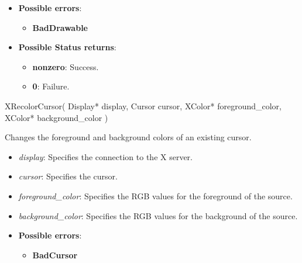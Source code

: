 \documentclass{report}
\begin{document}
\begin{itemize}
            \begin{itemize}
                \item \textbf{Possible errors}:
                    \begin{itemize}
                        \item \textbf{BadDrawable}
                    \end{itemize}
                \item \textbf{Possible Status returns}:
                    \begin{itemize}
                        \item \textbf{nonzero}: Success.
                        \item \textbf{0}: Failure.
                    \end{itemize}
            \end{itemize}

            \begin{cppcode}
                XRecolorCursor(
                    Display* display,
                    Cursor cursor,
                    XColor* foreground_color,
                    XColor* background_color
                )
            \end{cppcode}
            \bigbreak \noindent
            Changes the foreground and background colors of an existing cursor.

            \begin{itemize}
                \item \textit{display}: Specifies the connection to the X server.
                \item \textit{cursor}: Specifies the cursor.
                \item \textit{foreground\_color}: Specifies the RGB values for the foreground of the source.
                \item \textit{background\_color}: Specifies the RGB values for the background of the source.
            \end{itemize}

            \begin{itemize}
                \item \textbf{Possible errors}:
                    \begin{itemize}
                        \item \textbf{BadCursor}
                    \end{itemize}
            \end{itemize}


\end{itemize}
\end{document}
